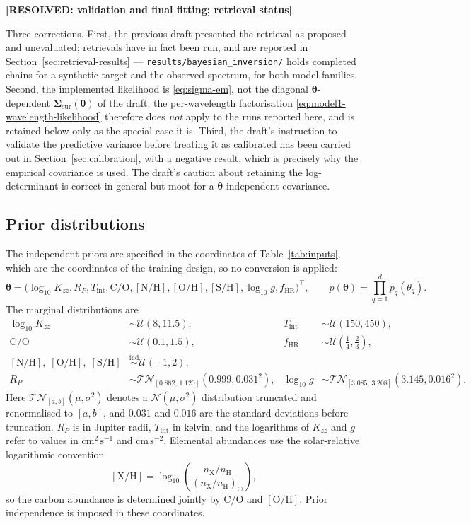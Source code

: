 \documentclass[12pt, letterpaper, oneside]{article}
\newcommand{\fhr}{f_{\mathrm{HR}}}
\newcommand{\resolved}[2]{\par\begingroup\small\color{green!35!black}%
\noindent\textbf{[RESOLVED: #1]}\par\nobreak\noindent #2\par\endgroup}
\begin{document}
\resolved{validation and final fitting; retrieval status}{Three corrections.
First, the previous draft presented the retrieval as proposed and unevaluated;
retrievals have in fact been run, and are reported in
Section~\ref{sec:retrieval-results} ---
\texttt{results/bayesian\_inversion/} holds completed chains for a synthetic
target and the observed spectrum, for both model families. Second, the
implemented likelihood is \eqref{eq:sigma-em}, not the diagonal
$\bm\theta$-dependent $\bm\Sigma_{\mathrm{sur}}(\bm\theta)$ of the draft; the
per-wavelength factorisation \eqref{eq:model1-wavelength-likelihood} therefore
does \emph{not} apply to the runs reported here, and is retained below only as
the special case it is. Third, the draft's instruction to validate the
predictive variance before treating it as calibrated has been carried out in
Section~\ref{sec:calibration}, with a negative result, which is precisely why
the empirical covariance is used. The draft's caution about retaining the
log-determinant is correct in general but moot for a $\bm\theta$-independent
covariance.}

\subsection{Prior distributions}
\label{subsub:prior}

The independent priors are specified in the coordinates of
Table~\ref{tab:inputs}, which are the coordinates of the training design, so
no conversion is applied:
\[
    \bm\theta =
    \bigl(
        \log_{10}K_{zz}, R_P, T_{\mathrm{int}}, \mathrm{C/O},
        [\mathrm{N/H}], [\mathrm{O/H}], [\mathrm{S/H}], \log_{10}g, \fhr
    \bigr)^\top,
    \qquad
    p(\bm\theta)=\prod_{q=1}^{d}p_q(\theta_q).
\]
The marginal distributions are
\begin{align}
    \log_{10}K_{zz} &\sim \mathcal U(8,11.5), &
    T_{\mathrm{int}} &\sim \mathcal U(150,450), \\
    \mathrm{C/O} &\sim \mathcal U(0.1,1.5), &
    \fhr &\sim \mathcal U\!\left(\tfrac14,\tfrac23\right), \\
    [\mathrm{N/H}],\;[\mathrm{O/H}],\;[\mathrm{S/H}]
    &\overset{\mathrm{ind}}{\sim} \mathcal U(-1,2), \\
    R_P &\sim \mathcal{TN}_{[0.882,\,1.120]}(0.999,0.031^2), &
    \log_{10}g &\sim \mathcal{TN}_{[3.085,\,3.208]}(3.145,0.016^2).
\end{align}
Here $\mathcal{TN}_{[a,b]}(\mu,\sigma^2)$ denotes a
$\mathcal N(\mu,\sigma^2)$ distribution truncated and renormalised to $[a,b]$,
and $0.031$ and $0.016$ are the standard deviations before truncation.
$R_P$ is in Jupiter radii, $T_{\mathrm{int}}$ in kelvin, and the logarithms of
$K_{zz}$ and $g$ refer to values in $\mathrm{cm^2\,s^{-1}}$ and
$\mathrm{cm\,s^{-2}}$. Elemental abundances use the solar-relative logarithmic
convention
\[
    [\mathrm{X/H}]
    =
    \log_{10}\!\left(
        \frac{n_{\mathrm X}/n_{\mathrm H}}
             {(n_{\mathrm X}/n_{\mathrm H})_\odot}
    \right),
\]
so the carbon abundance is determined jointly by $\mathrm{C/O}$ and
$[\mathrm{O/H}]$. Prior independence is imposed in these coordinates.
\end{document}
